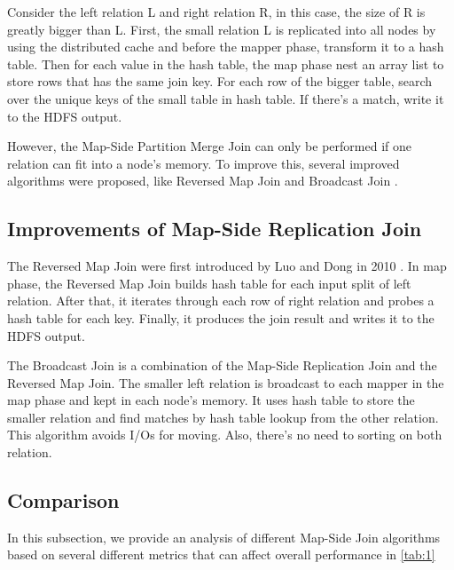 \documentclass[sigconf, nonacm]{acmart}
\begin{document}
Consider the left relation L and right relation R, in this case, the size of R is greatly bigger than L. First, the small relation L is replicated into all nodes by using the distributed cache and before the mapper phase, transform it to a hash table. Then for each value in the hash table,  the map phase nest an array list to store rows that has the same join key. For each row of the bigger table, search over the unique keys  of the small table in hash table. If there's a match, write it to the HDFS output. 

However, the Map-Side Partition Merge Join can only be performed if one relation can fit into a node's memory. To improve this, several improved algorithms were proposed, like Reversed Map Join \cite{luo2010adaptive} and Broadcast Join \cite{blanas2010comparison}.

\subsection{Improvements of Map-Side Replication Join}

The Reversed Map Join were first introduced by Luo and Dong in 2010 \cite{luo2010adaptive}. In map phase, the Reversed Map Join builds hash table for each input split of left relation. After that, it iterates through each row of right relation and probes a hash table for each key. Finally, it produces the join result and writes it to the HDFS output. 

The Broadcast Join is a combination of the Map-Side Replication Join and the Reversed Map Join. The smaller left relation is broadcast to each mapper in the map phase and kept in each node's memory. It uses hash table to store the smaller relation and find matches by hash table lookup from the other relation. This algorithm avoids I/Os for moving. Also, there's no need to sorting on both relation. 

\subsection{Comparison}
In this subsection, we provide an analysis of different Map-Side Join algorithms based on several different metrics that can affect overall performance in \autoref{tab:1} 
\end{document}
